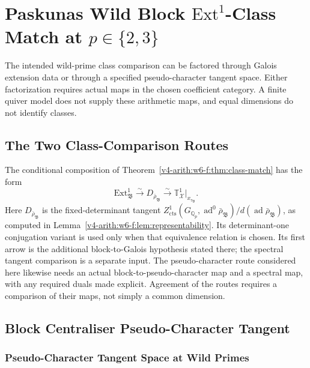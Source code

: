 \chapter{Paskunas Wild Block \(\mathrm{Ext}^{1}\)-Class Match at \(p\in\{2,3\}\)}
\label{v4-arith:w10-b:chapter}

The intended wild-prime class comparison can be factored through
Galois extension data or through a specified pseudo-character
tangent space. Either factorization requires actual maps in the
chosen coefficient category. A finite quiver model does not supply
these arithmetic maps, and equal dimensions do not identify classes.

\section{The Two Class-Comparison Routes}
\label{v4-arith:w10-b:domain}

The conditional composition of
Theorem~\ref{v4-arith:w6-f:thm:class-match} has the form
\begin{equation}
\label{v4-arith:w10-b:eq:ch66-colmez-arrow}
\mathrm{Ext}^1_{\mathfrak B}
 \xrightarrow{\sim}
 D_{\bar\rho_{\mathfrak B}}
 \xrightarrow{\sim}\mathbb T^1_{\mathcal X}|_{x_{\tau_{\mathfrak B}}}.
\end{equation}
Here \(D_{\bar\rho_{\mathfrak B}}\) is the fixed-determinant tangent
\(Z^1_{\mathrm{cts}}(G_{\mathbb Q_p},\operatorname{ad}^0\bar\rho_{\mathfrak B})/
d(\operatorname{ad}\bar\rho_{\mathfrak B})\), as computed in
Lemma~\ref{v4-arith:w6-f:lem:representability}. Its determinant-one
conjugation variant is used only when that equivalence relation is chosen.
Its first arrow is the additional block-to-Galois hypothesis stated
there; the spectral tangent comparison is a separate input. The
pseudo-character route considered here likewise needs an actual
block-to-pseudo-character map and a spectral map, with any required
duals made explicit. Agreement of the routes requires a comparison
of their maps, not simply a common dimension.

\section{Block Centraliser Pseudo-Character Tangent}
\label{v4-arith:w10-b:centraliser-tangent}

\subsection{Pseudo-Character Tangent Space at Wild Primes}

